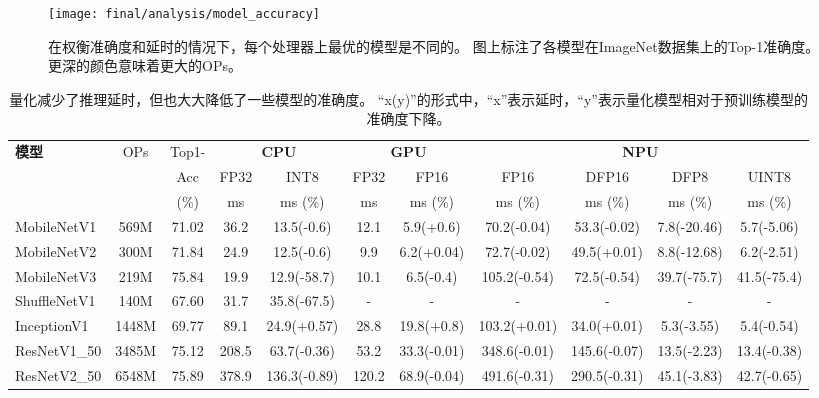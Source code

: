\begin{figure}[htbp]
	\centering
    \texttt{[image: final/analysis/model\_accuracy]}
    \caption{
        在权衡准确度和延时的情况下，每个处理器上最优的模型是不同的。
        图上标注了各模型在ImageNet数据集上的Top-1准确度。
        更深的颜色意味着更大的OPs。
    }
	\label{fig:model accuracy}
\end{figure}

\begin{table}[h]
	\begin{center}  
		\small
		\setlength\tabcolsep{2pt}
		\begin{tabular}	{l|c|c|cc|cc|cccc}
			\hline
			\multirow{3}{*}{\textbf{模型}}&	\multirow{3}{*}{{OPs}}&	{Top1-}&\multicolumn{2}{c|}{\textbf{CPU}} &\multicolumn{2}{c|}{\textbf{GPU}} &\multicolumn{4}{c}{\textbf{NPU}}\\
			&&Acc& FP32&INT8& FP32&FP16&FP16&DFP16&DFP8&UINT8\\
			&& (\%)& ms & ms (\%)& ms& ms (\%)& ms (\%)& ms (\%)& ms (\%)& ms (\%)\\
			
			\hline
			MobileNetV1 &569M &71.02&36.2 &13.5(-0.6)&12.1&5.9(+0.6)&70.2(-0.04)&53.3(-0.02)&7.8(-20.46)&5.7(-5.06)\\
			MobileNetV2 &300M& 71.84&24.9&12.5(-0.6)&9.9&6.2(+0.04)&72.7(-0.02)&49.5(+0.01)&8.8(-12.68)&6.2(-2.51)\\
			MobileNetV3 &219M&75.84 &19.9&12.9(-58.7)&10.1&6.5(-0.4)&105.2(-0.54)&72.5(-0.54)&39.7(-75.7)&41.5(-75.4)\\
            ShuffleNetV1 &140M&67.60&31.7&35.8(-67.5)& - & - & -& - & - & -\\
            InceptionV1 &1448M&69.77 &89.1&24.9(+0.57)&28.8&19.8(+0.8)&103.2(+0.01)&34.0(+0.01)&5.3(-3.55)&5.4(-0.54)\\
			ResNetV1\_50 &3485M&75.12 &208.5&63.7(-0.36)&53.2&33.3(-0.01)&348.6(-0.01)&145.6(-0.07)&13.5(-2.23)&13.4(-0.38)\\
			ResNetV2\_50 &6548M&75.89&378.9&136.3(-0.89)&120.2&68.9(-0.04) &491.6(-0.31)&290.5(-0.31)&45.1(-3.83)&42.7(-0.65)\\
            \hline
		\end{tabular}
	\end{center}
    \caption{
        量化减少了推理延时，但也大大降低了一些模型的准确度。
        ``x(y)''的形式中，``x''表示延时，``y''表示量化模型相对于预训练模型的准确度下降。
    }
    \label{tab:quantization accuracy latency}
\end{table}
